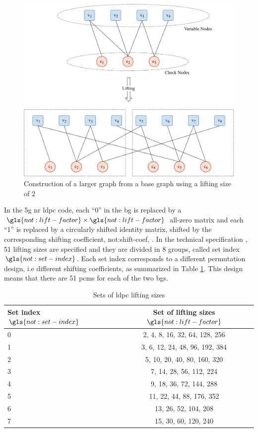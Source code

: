 \begin{figure}[htbp]
\includegraphics[width=\columnwidth]{figures/chp_theory/tanner_graph.pdf}
\caption{Construction of a larger graph from a base graph using a lifting size of 2}
\label{fig:graph-lifting}
\end{figure}


In the \gls{5g} \gls{nr} \gls{ldpc} code, each ``0'' in the \gls{bg} is replaced by a $\gls{not:lift-factor} \times \gls{not:lift-factor} $ all-zero matrix and each ``1'' is replaced by a circularly shifted identity matrix, shifted by the corresponding shifting coefficient, \gls{not:shift-coef}, \cite{ErikDahlman5G}.
%
In the technical specification \cite{3gpp.38.212}, 51 lifting sizes are specified and they are divided in 8 groups, called set index $\gls{not:set-index}$.
%
Each set index corresponds to a different permutation design, i.e different shifting coefficients, as summarized in Table \ref{tab:lift-table}.
%
This design means that there are 51 \glspl{pcm} for each of the two \glspl{bg}.

\begin{table}[htb]
\centering
\caption{Sets of \gls{ldpc} lifting sizes}
\label{tab:lift-table}
\begin{tabular}{l c}
  \toprule
  Set index $\gls{not:set-index}$   & Set of lifting sizes $\gls{not:lift-factor}$ \\
  \midrule
  0  &  2, 4, 8, 16, 32, 64, 128, 256 \\
  1  &  3, 6, 12, 24, 48, 96, 192, 384 \\
  2  &  5, 10, 20, 40, 80, 160, 320 \\
  3  &  7, 14, 28, 56, 112, 224 \\
  4  &  9, 18, 36, 72, 144, 288 \\
  5  &  11, 22, 44, 88, 176, 352 \\
  6  &  13, 26, 52, 104, 208 \\
  7  &  15, 30, 60, 120, 240 \\
  \bottomrule
\end{tabular}
\end{table}


